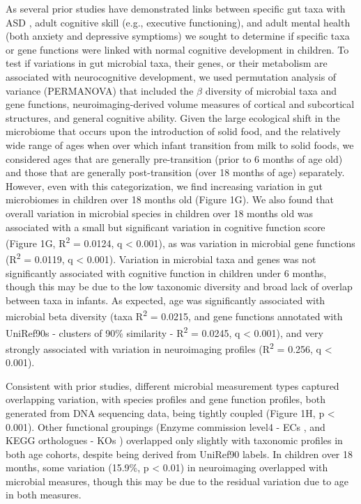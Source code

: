 \documentclass{article}
\begin{document}
As several prior studies have demonstrated links between specific gut taxa
with ASD \cite{liuAlteredGutMicrobiota2019,wanUnderdevelopmentGutMicrobiota2021},
adult cognitive skill (e.g., executive functioning)\cite{magnussonRelationshipsDietrelatedChanges2015},
and adult mental health (both anxiety and depressive symptioms)\cite{mayneris-perxachsMicrobiotaAlterationsProline2022,needhamGutderivedMetaboliteAlters2022}
we sought to determine if specific taxa or gene functions were linked with normal cognitive development in children.
To test if variations in gut microbial taxa,
their genes, or their metabolism are associated with neurocognitive
development, we used permutation analysis of variance (PERMANOVA) 
that included the $\beta$ diversity of microbial taxa and gene functions,
neuroimaging-derived volume measures of cortical and subcortical structures,
and general cognitive ability.
Given the large ecological shift in the microbiome that occurs upon the introduction of solid food,
and the relatively wide range of ages when over which infant transition from milk to solid foods,
we considered ages that are generally pre-transition (prior to 6 months of age old)
and those that are generally post-transition (over 18 months of age) separately.
However, even with this categorization, we find increasing variation
in gut microbiomes in children over 18 months old (Figure 1G).
We also found that overall variation in microbial species in children over 18 months old
was associated with a small but significant variation in cognitive function score
(Figure 1G, R\textsuperscript{2} = 0.0124, q \textless{} 0.001),
as was variation in microbial gene functions (R\textsuperscript{2} = 0.0119, q \textless{} 0.001).
Variation in microbial taxa and genes was not significantly associated with cognitive
function in children under 6 months, though this may be due to the low
taxonomic diversity and broad lack of overlap between taxa in infants.
As expected, age was significantly associated with microbial beta
diversity (taxa R\textsuperscript{2} = 0.0215, and  gene functions
annotated with UniRef90s - clusters of 90\% similarity
\cite{suzekUniRefComprehensiveNonredundant2007} -
R\textsuperscript{2} = 0.0245, q \textless{} 0.001), and very strongly
associated with variation in neuroimaging profiles (R\textsuperscript{2} = 0.256, q
\textless{} 0.001).

Consistent with prior studies, different microbial measurement types
captured overlapping variation, with species profiles and gene function
profiles, both generated from DNA sequencing data, being tightly coupled
(Figure 1H, p \textless{} 0.001). Other functional
groupings (Enzyme commission level4 - ECs
\cite{bairochENZYMEDatabase20002000},
and KEGG orthologues - KOs
\cite{kanehisaKEGGResourceDeciphering2004})
overlapped only slightly with taxonomic profiles in both age
cohorts, despite being derived from UniRef90 labels. In children over 18
months, some variation (15.9\%, p \textless{} 0.01) in neuroimaging
overlapped with microbial measures, though this may be due to the
residual variation due to age in both measures.
\end{document}
